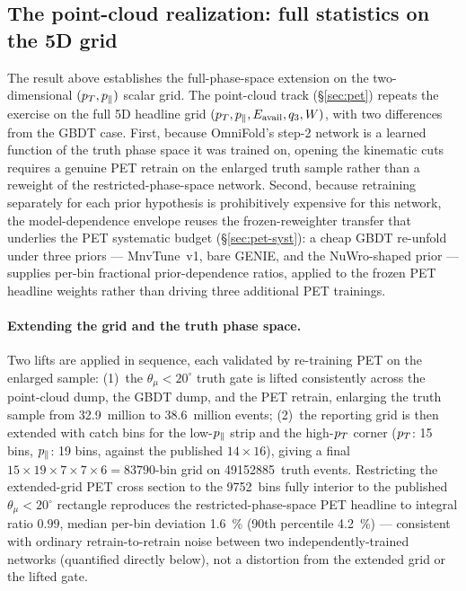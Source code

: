 \subsection{The point-cloud realization: full statistics on the 5D grid}
\label{sec:fps-pet}
The result above establishes the full-phase-space extension on the
two-dimensional $(p_{T},p_{\parallel})$ scalar grid. The point-cloud track
(\S\ref{sec:pet}) repeats the exercise on the full 5D headline grid
$(p_{T},p_{\parallel},E_{\mathrm{avail}},q_3,W)$, with two differences from the GBDT case. First,
because OmniFold's step-2 network is a learned function of the truth phase
space it was trained on, opening the kinematic cuts requires a genuine PET
retrain on the enlarged truth sample rather than a reweight of the
restricted-phase-space network. Second, because retraining separately for
each prior hypothesis is prohibitively expensive for this network, the
model-dependence envelope reuses the frozen-reweighter transfer that
underlies the PET systematic budget (\S\ref{sec:pet-syst}): a cheap GBDT
re-unfold under three priors --- MnvTune~v1, bare GENIE, and the NuWro-shaped
prior --- supplies per-bin fractional prior-dependence ratios, applied to the
frozen PET headline weights rather than driving three additional PET
trainings.

\paragraph{Extending the grid and the truth phase space.}
Two lifts are applied in sequence, each validated by re-training PET on the
enlarged sample: (1)~the $\theta_\mu<20^\circ$ truth gate is lifted
consistently across the point-cloud dump, the GBDT dump, and the PET retrain,
enlarging the truth sample from \num{32.9}~million to \num{38.6}~million
events; (2)~the reporting grid is then extended with catch bins for the
low-$p_{\parallel}$ strip and the high-$p_{T}$ corner ($p_{T}$: 15 bins, $p_{\parallel}$: 19 bins,
against the published $14\times16$), giving a final
$15\times19\times7\times7\times6=\num{83790}$-bin grid on
\num{49152885}~truth events. Restricting the extended-grid PET cross section
to the \num{9752}~bins fully interior to the published $\theta_\mu<20^\circ$
rectangle reproduces the restricted-phase-space PET headline to integral
ratio $0.99$, median per-bin deviation \SI{1.6}{\percent} (90th percentile
\SI{4.2}{\percent}) --- consistent with ordinary retrain-to-retrain noise
between two independently-trained networks (quantified directly below), not a
distortion from the extended grid or the lifted gate.

